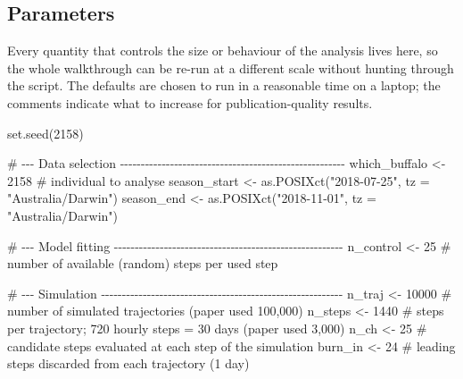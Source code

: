 \documentclass[
  letterpaper,
  DIV=11,
  numbers=noendperiod]{scrartcl}
\newenvironment{Shaded}{\begin{snugshade}}{\end{snugshade}}
\newcommand{\AttributeTok}[1]{\textcolor[rgb]{0.40,0.45,0.13}{#1}}
\newcommand{\CommentTok}[1]{\textcolor[rgb]{0.37,0.37,0.37}{#1}}
\newcommand{\DecValTok}[1]{\textcolor[rgb]{0.68,0.00,0.00}{#1}}
\newcommand{\FunctionTok}[1]{\textcolor[rgb]{0.28,0.35,0.67}{#1}}
\newcommand{\NormalTok}[1]{\textcolor[rgb]{0.00,0.23,0.31}{#1}}
\newcommand{\OtherTok}[1]{\textcolor[rgb]{0.00,0.23,0.31}{#1}}
\newcommand{\StringTok}[1]{\textcolor[rgb]{0.13,0.47,0.30}{#1}}
\begin{document}
\subsection{Parameters}\label{parameters}

Every quantity that controls the size or behaviour of the analysis lives
here, so the whole walkthrough can be re-run at a different scale
without hunting through the script. The defaults are chosen to run in a
reasonable time on a laptop; the comments indicate what to increase for
publication-quality results.

\begin{Shaded}
\begin{Highlighting}[]
\FunctionTok{set.seed}\NormalTok{(}\DecValTok{2158}\NormalTok{)}

\CommentTok{\# {-}{-}{-} Data selection {-}{-}{-}{-}{-}{-}{-}{-}{-}{-}{-}{-}{-}{-}{-}{-}{-}{-}{-}{-}{-}{-}{-}{-}{-}{-}{-}{-}{-}{-}{-}{-}{-}{-}{-}{-}{-}{-}{-}{-}{-}{-}{-}{-}{-}{-}{-}{-}{-}{-}{-}{-}{-}{-}}
\NormalTok{which\_buffalo }\OtherTok{\textless{}{-}} \DecValTok{2158}                                          \CommentTok{\# individual to analyse}
\NormalTok{season\_start  }\OtherTok{\textless{}{-}} \FunctionTok{as.POSIXct}\NormalTok{(}\StringTok{"2018{-}07{-}25"}\NormalTok{, }\AttributeTok{tz =} \StringTok{"Australia/Darwin"}\NormalTok{)}
\NormalTok{season\_end    }\OtherTok{\textless{}{-}} \FunctionTok{as.POSIXct}\NormalTok{(}\StringTok{"2018{-}11{-}01"}\NormalTok{, }\AttributeTok{tz =} \StringTok{"Australia/Darwin"}\NormalTok{)}

\CommentTok{\# {-}{-}{-} Model fitting {-}{-}{-}{-}{-}{-}{-}{-}{-}{-}{-}{-}{-}{-}{-}{-}{-}{-}{-}{-}{-}{-}{-}{-}{-}{-}{-}{-}{-}{-}{-}{-}{-}{-}{-}{-}{-}{-}{-}{-}{-}{-}{-}{-}{-}{-}{-}{-}{-}{-}{-}{-}{-}{-}{-}}
\NormalTok{n\_control }\OtherTok{\textless{}{-}} \DecValTok{25}    \CommentTok{\# number of available (random) steps per used step}

\CommentTok{\# {-}{-}{-} Simulation {-}{-}{-}{-}{-}{-}{-}{-}{-}{-}{-}{-}{-}{-}{-}{-}{-}{-}{-}{-}{-}{-}{-}{-}{-}{-}{-}{-}{-}{-}{-}{-}{-}{-}{-}{-}{-}{-}{-}{-}{-}{-}{-}{-}{-}{-}{-}{-}{-}{-}{-}{-}{-}{-}{-}{-}{-}{-}}
\NormalTok{n\_traj  }\OtherTok{\textless{}{-}} \DecValTok{10000}   \CommentTok{\# number of simulated trajectories (paper used 100,000)}
\NormalTok{n\_steps }\OtherTok{\textless{}{-}} \DecValTok{1440}     \CommentTok{\# steps per trajectory; 720 hourly steps = 30 days (paper used 3,000)}
\NormalTok{n\_ch    }\OtherTok{\textless{}{-}} \DecValTok{25}      \CommentTok{\# candidate steps evaluated at each step of the simulation}
\NormalTok{burn\_in }\OtherTok{\textless{}{-}} \DecValTok{24}      \CommentTok{\# leading steps discarded from each trajectory (1 day)}


\end{Highlighting}
\end{Shaded}
\end{document}
